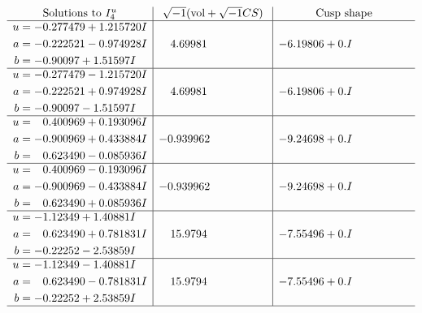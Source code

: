 \documentclass[1p]{elsarticle_modified}
\theoremstyle{definition}
\newcommand{\I}{\sqrt{-1}}
\begin{document}
$$\begin{array}{c|c|c}  
\text{Solutions to }I^u_{4}& \I (\text{vol} + \sqrt{-1}CS) & \text{Cusp shape}\\
 \hline 
\begin{aligned}
u &= -0.277479 + 1.215720 I \\
a &= -0.222521 - 0.974928 I \\
b &= -0.90097 + 1.51597 I\end{aligned}
 & \phantom{-}4.69981\phantom{ +0.000000I} & -6.19806 + 0. I\phantom{ +0.000000I} \\ \hline\begin{aligned}
u &= -0.277479 - 1.215720 I \\
a &= -0.222521 + 0.974928 I \\
b &= -0.90097 - 1.51597 I\end{aligned}
 & \phantom{-}4.69981\phantom{ +0.000000I} & -6.19806 + 0. I\phantom{ +0.000000I} \\ \hline\begin{aligned}
u &= \phantom{-}0.400969 + 0.193096 I \\
a &= -0.900969 + 0.433884 I \\
b &= \phantom{-}0.623490 - 0.085936 I\end{aligned}
 & -0.939962\phantom{ +0.000000I} & -9.24698 + 0. I\phantom{ +0.000000I} \\ \hline\begin{aligned}
u &= \phantom{-}0.400969 - 0.193096 I \\
a &= -0.900969 - 0.433884 I \\
b &= \phantom{-}0.623490 + 0.085936 I\end{aligned}
 & -0.939962\phantom{ +0.000000I} & -9.24698 + 0. I\phantom{ +0.000000I} \\ \hline\begin{aligned}
u &= -1.12349 + 1.40881 I \\
a &= \phantom{-}0.623490 + 0.781831 I \\
b &= -0.22252 - 2.53859 I\end{aligned}
 & \phantom{-}15.9794\phantom{ +0.000000I} & -7.55496 + 0. I\phantom{ +0.000000I} \\ \hline\begin{aligned}
u &= -1.12349 - 1.40881 I \\
a &= \phantom{-}0.623490 - 0.781831 I \\
b &= -0.22252 + 2.53859 I\end{aligned}
 & \phantom{-}15.9794\phantom{ +0.000000I} & -7.55496 + 0. I\phantom{ +0.000000I}\\
 \hline 
 \end{array}$$\newpage
\end{document}
